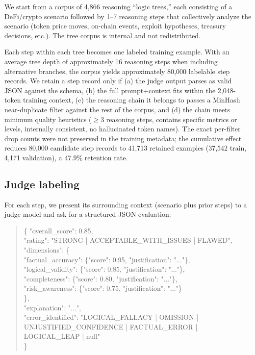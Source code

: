 \documentclass[10pt,letterpaper]{article}
\begin{document}
We start from a corpus of 4{,}866 reasoning ``logic trees,'' each consisting of a DeFi/crypto scenario followed by 1--7 reasoning steps that collectively analyze the scenario (token price moves, on-chain events, exploit hypotheses, treasury decisions, etc.). The tree corpus is internal and not redistributed.

Each step within each tree becomes one labeled training example. With an average tree depth of approximately 16 reasoning steps when including alternative branches, the corpus yields approximately 80{,}000 labelable step records. We retain a step record only if (a) the judge output parses as valid JSON against the schema, (b) the full prompt+context fits within the 2{,}048-token training context, (c) the reasoning chain it belongs to passes a MinHash near-duplicate filter against the rest of the corpus, and (d) the chain meets minimum quality heuristics ($\geq$3 reasoning steps, contains specific metrics or levels, internally consistent, no hallucinated token names). The exact per-filter drop counts were not preserved in the training metadata; the cumulative effect reduces 80{,}000 candidate step records to 41{,}713 retained examples (37{,}542 train, 4{,}171 validation), a 47.9\% retention rate.

\subsection{Judge labeling}

For each step, we present its surrounding context (scenario plus prior steps) to a judge model and ask for a structured JSON evaluation:

\begin{quote}\small\ttfamily
\{ "overall\_score": 0.85,\\
\hspace*{1em}"rating": "STRONG | ACCEPTABLE\_WITH\_ISSUES | FLAWED",\\
\hspace*{1em}"dimensions": \{\\
\hspace*{2em}"factual\_accuracy":  \{"score": 0.95, "justification": "..."\},\\
\hspace*{2em}"logical\_validity":  \{"score": 0.85, "justification": "..."\},\\
\hspace*{2em}"completeness":      \{"score": 0.80, "justification": "..."\},\\
\hspace*{2em}"risk\_awareness":   \{"score": 0.75, "justification": "..."\}\\
\hspace*{1em}\},\\
\hspace*{1em}"explanation": "...",\\
\hspace*{1em}"error\_identified": "LOGICAL\_FALLACY | OMISSION | UNJUSTIFIED\_CONFIDENCE | FACTUAL\_ERROR | LOGICAL\_LEAP | null"\\
\}
\end{quote}
\end{document}
